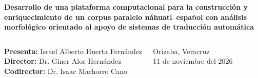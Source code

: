 \documentclass[aspectratio=169,10pt]{beamer}
\begin{document}
\begin{frame}[plain]
\begin{center}
\begin{minipage}{0.90\textwidth}
{\color{NahuaGreen}
\Large\bfseries
Desarrollo de una plataforma computacional para la
construcción y enriquecimiento de un corpus paralelo
náhuatl--español
con análisis morfológico orientado al apoyo de
sistemas de traducción automática
}

\end{minipage}

\end{center}


\vfill

\begin{columns}[b,onlytextwidth]


    {\small
    \textbf{\color{NahuaGreen}Presenta:}
    Israel Alberto Huerta Fernández\\[0.10cm]

    \textbf{\color{NahuaGreen}Director:}
    Dr. Giner Alor Hernández\\[0.10cm]

    \textbf{\color{NahuaGreen}Codirector:}
    Dr. Isaac Machorro Cano
    }


    \raggedleft

    {\small\color{Muted}
    Orizaba, Veracruz\\
    {}11 de noviembre del 2026
    }

\end{columns}

\vspace{0.20cm}

\end{frame}
\end{document}
